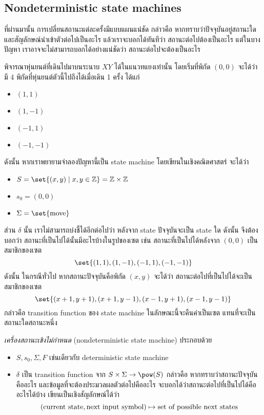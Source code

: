 \subsection{Nondeterministic state machines}

ที่ผ่านมานั้น การเปลี่ยนสถานะแต่ละครั้งมีแบบแผนแน่ชัด กล่าวคือ หากทราบว่าปัจจุบันอยู่สถานะใด และสัญลักษณ์นำเข้าตัวต่อไปเป็นอะไร แล้วเราจะบอกได้ทันทีว่า สถานะต่อไปต้องเป็นอะไร แต่ในบางปัญหา เราอาจจะไม่สามารถบอกได้อย่างแน่ชัดว่า สถานะต่อไปจะต้องเป็นอะไร

\begin{example}
พิจารณาหุ่นยนต์ที่เดินไปมาบนระนาบ $XY$ ได้ในแนวทแยงเท่านั้น โดยเริ่มที่พิกัด $(0,0)$ จะได้ว่า มี 4 พิกัดที่หุ่นยนต์ตัวนี้ไปถึงได้เมื่อเดิน 1 ครั้ง ได้แก่
\begin{itemize}
\item $(1,1)$
\item $(1,-1)$
\item $(-1,1)$
\item $(-1,-1)$
\end{itemize}
ดังนั้น หากเราพยายามจำลองปัญหานี้เป็น state machine โดยเขียนในเชิงคณิตศาสตร์ จะได้ว่า
\begin{itemize}
\item $S=\set{(x,y)\mid x,y\in\mathbb{Z}}=\mathbb{Z}\times\mathbb{Z}$
\item $s_0=(0,0)$
\item $\Sigma=\set{\textup{move}}$
\end{itemize}
ส่วน $\delta$ นั้น เราไม่สามารถบ่งชี้ได้อีกต่อไปว่า หลังจาก state ปัจจุบันจะเป็น state ใด ดังนั้น จึงต้องบอกว่า สถานะที่เป็นไปได้นั้นมีอะไรบ้างในรูปของเซต เช่น สถานะที่เป็นไปได้หลังจาก $(0,0)$ เป็นสมาชิกของเซต \[\set{(1,1),(1,-1),(-1,1),(-1,-1)}\] ดังนั้น ในกรณีทั่วไป หากสถานะปัจจุบันคือพิกัด $(x,y)$ จะได้ว่า สถานะต่อไปที่เป็นไปได้จะเป็นสมาชิกของเซต \[\set{(x+1,y+1),(x+1,y-1),(x-1,y+1),(x-1,y-1)}\] กล่าวคือ transition function ของ state machine ในลักษณะนี้จะคืนค่าเป็นเซต แทนที่จะเป็นสถานะใดสถานะหนึ่ง
\end{example}

\begin{definition}
\emph{เครื่องสถานะเชิงไม่กำหนด} (nondeterministic state machine) ประกอบด้วย
\begin{itemize}
\item $S,s_0,\Sigma,F$ เช่นเดียวกับ deterministic state machine
\item $\delta$ เป็น transition function จาก $S\times\Sigma\to\pow(S)$ กล่าวคือ หากทราบว่าสถานะปัจจุบันคืออะไร และข้อมูลที่จะต้องประมวลผลตัวต่อไปคืออะไร จะบอกได้ว่าสถานะต่อไปที่เป็นไปได้คืออะไรได้บ้าง เขียนเป็นเชิงสัญลักษณ์ได้ว่า \[(\textup{current state},\textup{next input symbol})\mapsto\textup{set of possible next states}\]
\end{itemize}
\end{definition}
